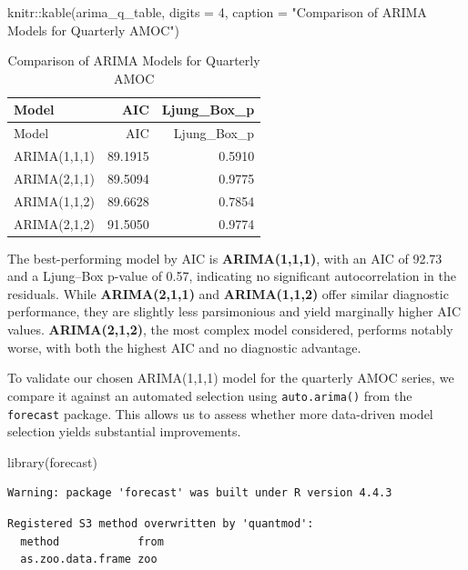 \documentclass[
  11pt,
]{article}
\newenvironment{Shaded}{\begin{snugshade}}{\end{snugshade}}
\newcommand{\AttributeTok}[1]{\textcolor[rgb]{0.40,0.45,0.13}{#1}}
\newcommand{\DecValTok}[1]{\textcolor[rgb]{0.68,0.00,0.00}{#1}}
\newcommand{\FunctionTok}[1]{\textcolor[rgb]{0.28,0.35,0.67}{#1}}
\newcommand{\NormalTok}[1]{\textcolor[rgb]{0.00,0.23,0.31}{#1}}
\newcommand{\SpecialCharTok}[1]{\textcolor[rgb]{0.37,0.37,0.37}{#1}}
\newcommand{\StringTok}[1]{\textcolor[rgb]{0.13,0.47,0.30}{#1}}
\begin{document}
\begin{Shaded}
\begin{Highlighting}[]
\NormalTok{knitr}\SpecialCharTok{::}\FunctionTok{kable}\NormalTok{(arima\_q\_table, }\AttributeTok{digits =} \DecValTok{4}\NormalTok{, }\AttributeTok{caption =} \StringTok{"Comparison of ARIMA Models for Quarterly AMOC"}\NormalTok{)}
\end{Highlighting}
\end{Shaded}

\begin{longtable}[]{@{}lrr@{}}
\caption{Comparison of ARIMA Models for Quarterly AMOC}\tabularnewline
\toprule\noalign{}
Model & AIC & Ljung\_Box\_p \\
\midrule\noalign{}
\endfirsthead
\toprule\noalign{}
Model & AIC & Ljung\_Box\_p \\
\midrule\noalign{}
\endhead
\bottomrule\noalign{}
\endlastfoot
ARIMA(1,1,1) & 89.1915 & 0.5910 \\
ARIMA(2,1,1) & 89.5094 & 0.9775 \\
ARIMA(1,1,2) & 89.6628 & 0.7854 \\
ARIMA(2,1,2) & 91.5050 & 0.9774 \\
\end{longtable}

The best-performing model by AIC is \textbf{ARIMA(1,1,1)}, with an AIC
of 92.73 and a Ljung--Box p-value of 0.57, indicating no significant
autocorrelation in the residuals. While \textbf{ARIMA(2,1,1)} and
\textbf{ARIMA(1,1,2)} offer similar diagnostic performance, they are
slightly less parsimonious and yield marginally higher AIC values.
\textbf{ARIMA(2,1,2)}, the most complex model considered, performs
notably worse, with both the highest AIC and no diagnostic advantage.

To validate our chosen ARIMA(1,1,1) model for the quarterly AMOC series,
we compare it against an automated selection using \texttt{auto.arima()}
from the \texttt{forecast} package. This allows us to assess whether
more data-driven model selection yields substantial improvements.

\begin{Shaded}
\begin{Highlighting}[]
\FunctionTok{library}\NormalTok{(forecast)}
\end{Highlighting}
\end{Shaded}

\begin{verbatim}
Warning: package 'forecast' was built under R version 4.4.3
\end{verbatim}

\begin{verbatim}
Registered S3 method overwritten by 'quantmod':
  method            from
  as.zoo.data.frame zoo 
\end{verbatim}
\end{document}
